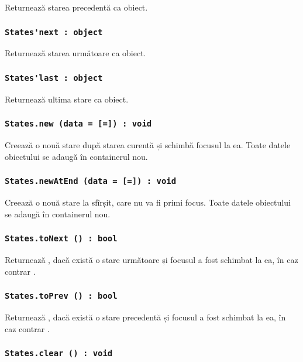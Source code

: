 Returnează starea precedentă ca obiect.

\subsubsection{\lstinline|States'next : object|}

Returnează starea următoare ca obiect.

\subsubsection{\lstinline|States'last : object|}

Returnează ultima stare ca obiect.

\subsubsection{\lstinline|States.new (data = [=]) : void|}

Creează o nouă stare după starea curentă și schimbă focusul la ea. Toate datele obiectului  se adaugă în containerul nou.

\subsubsection{\lstinline|States.newAtEnd (data = [=]) : void|}

Creează o nouă stare la sfîrșit, care nu va fi primi focus.  Toate datele obiectului  se adaugă în containerul nou.

\subsubsection{\lstinline|States.toNext () : bool|}

Returnează \true, dacă există o stare următoare și focusul a fost schimbat la ea, în caz contrar \false.

\subsubsection{\lstinline|States.toPrev () : bool|}

Returnează \true, dacă există o stare precedentă și focusul a fost schimbat la ea, în caz contrar \false.

\subsubsection{\lstinline|States.clear () : void|}

